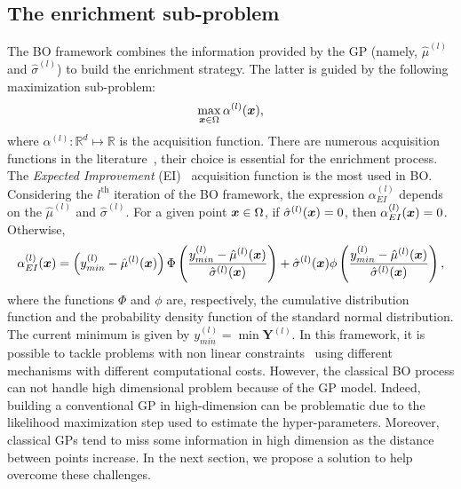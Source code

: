 \subsection{The enrichment sub-problem}

The BO framework combines the information provided by the GP (namely, $\hat\mu^{(l)}$ and $\hat\sigma^{(l)}$) to build the enrichment strategy. The latter is guided by the following maximization sub-problem:
\begin{equation}
    \max\limits_{\bm{x} \in \Omega} \alpha^{(l)}(\bm{x}),
    \label{eq:iner_opt}
\end{equation}
where $\alpha^{(l)}: \mathbb{R}^d \mapsto \mathbb{R}$ is the acquisition function.
There are numerous acquisition functions in the literature~\cite{frazierTutorialBayesianOptimization2018, ShahriariTakingHumanOut2016, WangMaxvalueentropysearch2017, bartoliAdaptiveModelingStrategy2019}, their choice is essential for the enrichment process.
The \textit{Expected Improvement} (EI)~\cite{JonesEfficientglobaloptimization1998} acquisition function is the most used in BO.
Considering the $l^{\mbox{th}}$ iteration of the BO framework, the expression $\alpha_{EI}^{(l)}$ depends on the $\hat\mu^{(l)}$ and $\hat\sigma^{(l)}$.
For a given point $\bm{x}\in \Omega$, if  $\hat\sigma^{(l)}(\bm{x}) = 0$, then $\alpha_{EI}^{(l)}(\bm{x})=0$.
Otherwise,
\begin{equation}
    \small
    \alpha_{EI}^{(l)}(\bm{x})=\left(y_{min}^{(l)} - \hat{\mu}^{(l)}(\bm{x})\right) \Phi \left( \frac{y_{min}^{(l)} - \hat{\mu}^{(l)}(\bm{x})}{\hat\sigma^{(l)}(\bm{x})} \right) + \hat\sigma^{(l)}(\bm{x}) \phi \left(  \frac{y_{min}^{(l)} - \hat{\mu}^{(l)}(\bm{x})}{\hat\sigma^{(l)}(\bm{x})} \right),
    \label{eq:EI}
\end{equation}
where the functions $\Phi$ and $\phi$ are, respectively, the cumulative distribution function and the probability density function of the standard normal distribution. The current minimum is given by $y_{min}^{(l)} = \min \bm{Y}^{(l)}$.
In this framework, it is possible to tackle problems with non linear constraints~\cite{frazierTutorialBayesianOptimization2018,priemOptimisationBayesienneSous2020,ShahriariTakingHumanOut2016} using different mechanisms with different computational costs.  
However, the classical BO process can not handle high dimensional problem because of the GP model.
Indeed, building a conventional GP in high-dimension can be problematic due to the likelihood maximization step used to estimate the hyper-parameters.
Moreover, classical GPs tend to miss some information in high dimension as the distance between points increase.
In the next section, we propose a solution to help overcome these challenges.
